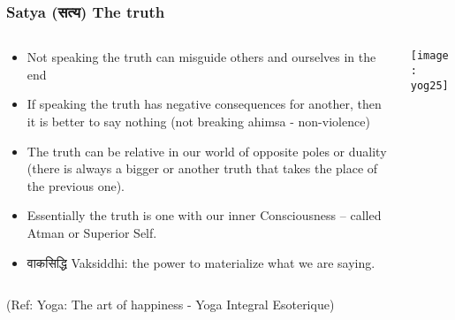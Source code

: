 \begin{frame}[fragile]\frametitle{Satya (सत्य) The truth}
   \begin{columns}
    \begin{column}[t]{0.7\linewidth}
	
	\begin{itemize}
	\item Not speaking the truth can misguide others and ourselves in the end
	\item If speaking the truth has negative consequences for another, then it is better to say nothing (not breaking ahimsa - non-violence)
	\item The truth can be relative in our world of opposite poles or duality (there is always a bigger or another truth that takes the place of the previous one).
	\item  Essentially the truth is one with our inner Consciousness – called Atman or Superior Self.
	\item वाकसिद्धि Vaksiddhi:  the power to materialize what we are saying.

	\end{itemize}
    \end{column}
    \begin{column}[t]{0.3\linewidth}		
\begin{center}
\texttt{[image: yog25]}

\end{center}

    \end{column}
  \end{columns}
  
  \tiny{(Ref: Yoga: The art of happiness - Yoga Integral Esoterique)}

\end{frame}

